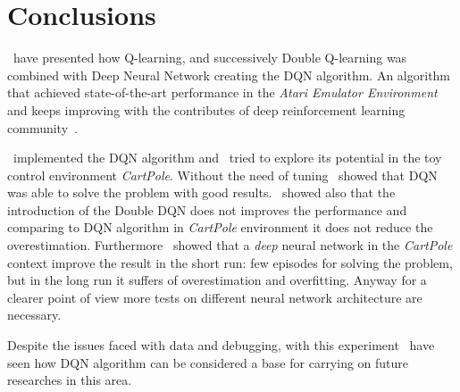 \section{Conclusions}

\Auth~have presented how Q-learning, and successively Double Q-learning was combined with Deep Neural Network creating the DQN algorithm. 
An algorithm that achieved state-of-the-art performance in the \textit{Atari Emulator Environment} and keeps improving with the contributes of deep reinforcement learning community~\cite{DBLP:journals/corr/abs-1710-02298}.

\Auth~implemented the DQN algorithm and \auth~tried to explore its potential in the toy control environment \textit{CartPole}. Without the need of tuning \auth~showed that DQN was able to solve the problem with good results. \Auth~showed also that the introduction of the Double DQN does not improves the performance and comparing to DQN algorithm in \textit{CartPole} environment it does not reduce the overestimation. Furthermore \auth~showed that a \textit{deep} neural network in the \textit{CartPole} context improve the result in the short run: few episodes for solving the problem, but in the long run it suffers of overestimation and overfitting. Anyway for a clearer point of view more tests on different neural network architecture are necessary.

Despite the issues faced with data and debugging, with this experiment \auth~have seen how DQN algorithm can be considered a base for carrying on future researches in this area. 